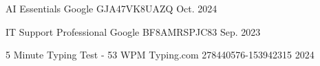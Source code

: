 
\begin{cvhonors}

  \cvhonor
    {AI Essentials} %
    {Google} %
    {GJA47VK8UAZQ} %
    {Oct. 2024} %

  \cvhonor
    {IT Support Professional} %
    {Google} %
    {BF8AMRSPJC83} %
    {Sep. 2023} %

  \cvhonor
    {5 Minute Typing Test - 53 WPM} %
    {Typing.com} %
    {278440576-153942315} %
    {2024} %

\end{cvhonors}
